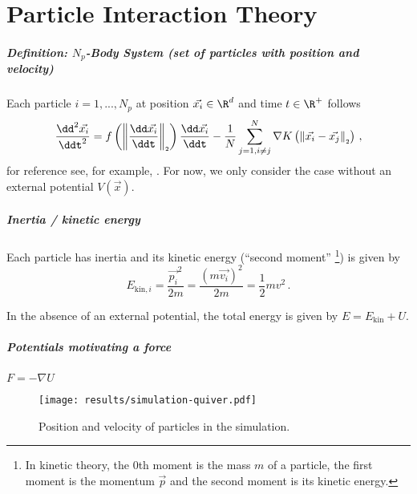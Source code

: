 \chapter{Particle Interaction Theory}
\label{chap:particle-interaction-theory}



\paragraph{Definition: $N_p$-Body System (set of particles with position and velocity)}
Each particle $i=1, ..., N_p$ at position $\vec{x_i} \in \R^d$ and time $t \in \R^+$ follows
$$\frac{\dd^2 \vec{x_i}}{\ddt^2} = f\left(\norm{\frac{\dd \vec{x_i}}{\ddt}}\right) \frac{\dd\vec{x_i}}{\ddt} - \frac{1}{N} \sum_{j=1, i\neq j}^{N} \nabla K\left(\norm{\vec{x_i} - \vec{x_j}}\right)\,,$$
for reference see, for example, \parencite{2020-power-law-kernels, 2021-arbitrary-dimensions}.
For now, we only consider the case without an external potential $V(\vec{x})$.

\paragraph{Inertia / kinetic energy}
Each particle has inertia and its kinetic energy (``second moment'' \footnote{
  In kinetic theory, the $0$th moment is the mass $m$ of a particle, the first moment is the momentum $\vec{p}$ and the second moment is its kinetic energy.
}) is given by
$$E_{\text{kin},i} = \frac{\vec{p_i}^2}{2m} = \frac{(m \vec{v_i})^2}{2m} = \frac{1}{2} m v^2\,.$$

In the absence of an external potential, the total energy is given by $E = E_{\text{kin}} + U$.

\paragraph{Potentials motivating a force}
\(F = -\nabla U\)

\begin{figure}[H]
  \centering
  \label{fig:simulation-quiver-illustration}
  \texttt{[image: results/simulation-quiver.pdf]}
  \caption{Position and velocity of particles in the simulation.}
\end{figure}

